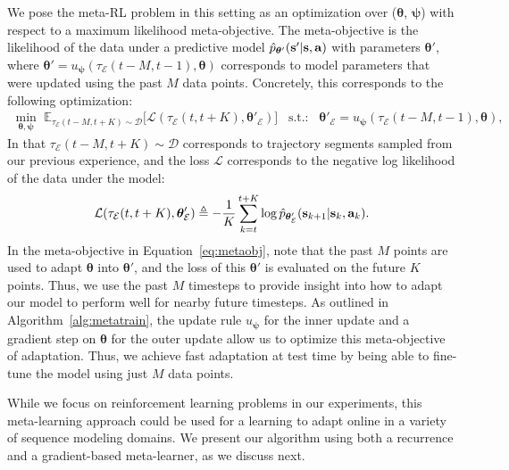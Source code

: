 We pose the meta-RL problem in this setting as an optimization over ($\bm{\theta}$, $\bm{\psi}$) with respect to a maximum likelihood meta-objective. The meta-objective is the likelihood of the data under a predictive model $\hat p_{\bm{\theta}'}({\bf s'}|{\bf s}, {\bf a})$ with parameters $\bm{\theta}'$, where \mbox{$\bm{\theta}' = u_{\bm{\psi}}(\tau_{\mathcal{E}}(t-M, t-1), \bm{\theta})$} corresponds to model parameters that were updated using the past $M$ data points. Concretely, this corresponds to the following optimization:
%
\begin{align}
\label{eq:metaobj}
    \min_{\bm{\theta}, \bm{\psi}} \hspace{4pt} \mathbb{E}_{\tau_{\mathcal{E}}(t-M, t+K) \sim \mathcal{D}}  \big[ \mathcal{L}(\tau_{\mathcal{E}}(t, t+K), \bm{\theta}'_{\mathcal{E}})\big] \hspace{10pt}
\text{s.t.:} \hspace{10pt} \bm{\theta}'_{\mathcal{E}} = u_{\bm{\psi}}(\tau_{\mathcal{E}}(t-M, t-1), \bm{\theta}),
\end{align}
%
In that $\tau_{\mathcal{E}}(t-M, t+K) \sim \mathcal{D}$ corresponds to trajectory segments sampled from our previous experience, and the loss $\mathcal{L}$ corresponds to the negative log likelihood of the data under the model:
%
\begin{align}
\mathcal{L}(\tau_{\mathcal{E}}(t, t+K), \bm{\theta}_{\mathcal{E}}') \triangleq -\frac{1}{K} 
\sum_{k=t}^{t+K}
\log \hat p_{\bm{\theta}_{\mathcal{E}}'} ( {\bf s}_{k+1} | {\bf s}_{k}, {\bf a}_{k}).
    \label{eq:inner update}
\end{align}
% 
In the meta-objective in Equation~\ref{eq:metaobj}, note that the past $M$ points are used to adapt $\bm{\theta}$ into $\bm{\theta'}$, and the loss of this $\bm{\theta'}$ is evaluated on the future $K$ points. Thus, we use the past $M$ timesteps to provide insight into how to adapt our model to perform well for nearby future timesteps. As outlined in Algorithm~\ref{alg:metatrain}, the update rule $u_{\bm{\psi}}$ for the inner update and a gradient step on $\bm{\theta}$ for the outer update allow us to optimize this meta-objective of adaptation. Thus, we achieve fast adaptation at test time by being able to fine-tune the model using just $M$ data points. 

While we focus on reinforcement learning problems in our experiments, this meta-learning approach could be used for a learning to adapt online in a variety of sequence modeling domains. We present our algorithm using both a recurrence and a gradient-based meta-learner, as we discuss next.

